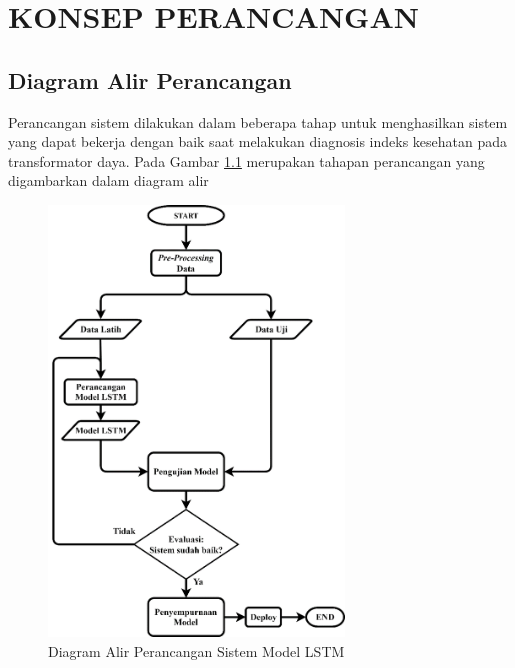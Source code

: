 \chapter{KONSEP PERANCANGAN}
\label{BAB3:Metode}
\section{Diagram Alir Perancangan}
Perancangan sistem dilakukan dalam beberapa tahap untuk menghasilkan sistem 
yang dapat bekerja dengan baik saat melakukan diagnosis indeks kesehatan pada 
transformator daya. Pada Gambar \ref{gambar:diagram alir} merupakan tahapan perancangan yang 
digambarkan dalam diagram alir
\begin{figure}[h]
	\begin{center}
		\includegraphics[width=0.7\textwidth]{BAB-3/figures/diagram alir.png}	
		\caption{Diagram Alir Perancangan Sistem Model LSTM}
		\label{gambar:diagram alir}
	\end{center}
\end{figure}

